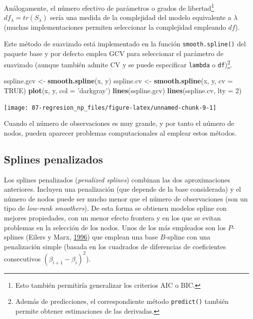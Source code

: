 \documentclass[
  spanish,
]{book}
\newenvironment{Shaded}{\begin{snugshade}}{\end{snugshade}}
\newcommand{\DataTypeTok}[1]{\textcolor[rgb]{0.13,0.29,0.53}{#1}}
\newcommand{\DecValTok}[1]{\textcolor[rgb]{0.00,0.00,0.81}{#1}}
\newcommand{\KeywordTok}[1]{\textcolor[rgb]{0.13,0.29,0.53}{\textbf{#1}}}
\newcommand{\NormalTok}[1]{#1}
\newcommand{\OtherTok}[1]{\textcolor[rgb]{0.56,0.35,0.01}{#1}}
\newcommand{\StringTok}[1]{\textcolor[rgb]{0.31,0.60,0.02}{#1}}
\theoremstyle{break}
\theoremstyle{definition}
\theoremstyle{definition}
\theoremstyle{definition}
\theoremstyle{remark}
\begin{document}
Análogamente, el número efectivo de parámetros o grados de libertad\footnote{Esto también permitiría generalizar los criterios AIC o BIC.} \(df_{\lambda}=tr(S_{\lambda})\) sería una medida de la complejidad del modelo equivalente a \(\lambda\) (muchas implementaciones permiten seleccionar la complejidad empleando \(df\)).

Este método de suavizado está implementado en la función \texttt{smooth.spline()} del paquete base y por defecto emplea GCV para seleccionar el parámetro de suavizado (aunque también admite CV y se puede especificar \texttt{lambda} o \texttt{df})\footnote{Además de predicciones, el correspondiente método \texttt{predict()} también permite obtener estimaciones de las derivadas.}.

\begin{Shaded}
\begin{Highlighting}[]
\NormalTok{sspline.gcv <-}\StringTok{ }\KeywordTok{smooth.spline}\NormalTok{(x, y)}
\NormalTok{sspline.cv <-}\StringTok{ }\KeywordTok{smooth.spline}\NormalTok{(x, y, }\DataTypeTok{cv =} \OtherTok{TRUE}\NormalTok{)}
\KeywordTok{plot}\NormalTok{(x, y, }\DataTypeTok{col =} \StringTok{'darkgray'}\NormalTok{)}
\KeywordTok{lines}\NormalTok{(sspline.gcv)}
\KeywordTok{lines}\NormalTok{(sspline.cv, }\DataTypeTok{lty =} \DecValTok{2}\NormalTok{)}
\end{Highlighting}
\end{Shaded}

\begin{center}\texttt{[image: 07-regresion\_np\_files/figure-latex/unnamed-chunk-9-1]} \end{center}

Cuando el número de observaciones es muy grande, y por tanto el número de nodos, pueden aparecer problemas computacionales al emplear estos métodos.

\hypertarget{splines-penalizados}{%
\subsection{Splines penalizados}\label{splines-penalizados}}

Los splines penalizados (\emph{penalized splines}) combinan las dos aproximaciones anteriores.
Incluyen una penalización (que depende de la base considerada) y el número de nodos puede ser mucho menor que el número de observaciones (son un tipo de \emph{low-rank smoothers}). De esta forma se obtienen modelos spline con mejores propiedades, con un menor efecto frontera y en los que se evitan problemas en la selección de los nodos.
Unos de los más empleados son los \(P\)-splines (Eilers y Marx, \protect\hyperlink{ref-eilers1996flexible}{1996}) que emplean una base \(B\)-spline con una penalización simple (basada en los cuadrados de diferencias de coeficientes consecutivos \((\beta_{i+1} - \beta_i)^2\)).
\end{document}
